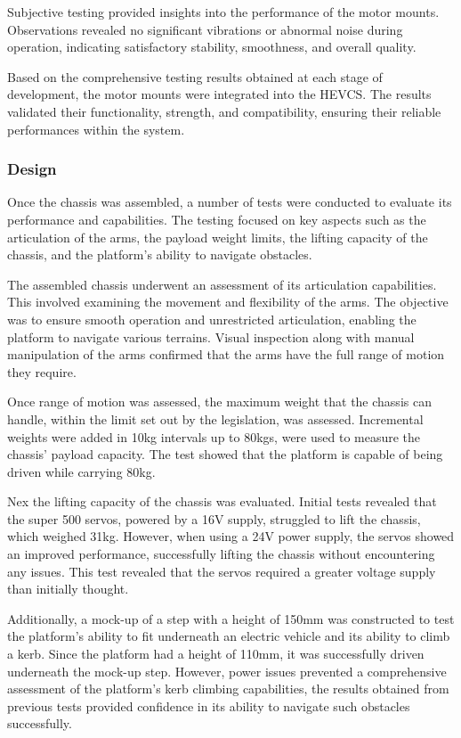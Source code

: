 \documentclass [12pt]{article}
\begin{document}
Subjective testing provided insights into the performance of the motor mounts. Observations revealed no significant vibrations or abnormal noise during operation, indicating satisfactory stability, smoothness, and overall quality. 

Based on the comprehensive testing results obtained at each stage of development, the motor mounts were integrated into the HEVCS. The results validated their functionality, strength, and compatibility, ensuring their reliable performances within the system.

\subsubsection{Design}

Once the chassis was assembled, a number of tests were conducted to evaluate its performance and capabilities. The testing focused on key aspects such as the articulation of the arms, the payload weight limits, the lifting capacity of the chassis, and the platform’s ability to navigate obstacles.

The assembled chassis underwent an assessment of its articulation capabilities. This involved examining the movement and flexibility of the arms. The objective was to ensure smooth operation and unrestricted articulation, enabling the platform to navigate various terrains. Visual inspection along with manual manipulation of the arms confirmed that the arms have the full range of motion they require.

Once range of motion was assessed, the maximum weight that the chassis can handle, within the limit set out by the legislation, was assessed. Incremental weights were added in 10kg intervals up to 80kgs, were used to measure the chassis’ payload capacity. The test showed that the platform is capable of being driven while carrying 80kg.

Nex the lifting capacity of the chassis was evaluated. Initial tests revealed that the super 500 servos, powered by a 16V supply, struggled to lift the chassis, which weighed 31kg. However, when using a 24V power supply, the servos showed an improved performance, successfully lifting the chassis without encountering any issues. This test revealed that the servos required a greater voltage supply than initially thought.

Additionally, a mock-up of a step with a height of 150mm was constructed to test the platform’s ability to fit underneath an electric vehicle and its ability to climb a kerb. Since the platform had a height of 110mm, it was successfully driven underneath the mock-up step. However, power issues prevented a comprehensive assessment of the platform’s kerb climbing capabilities, the results obtained from previous tests provided confidence in its ability to navigate such obstacles successfully.
\end{document}

